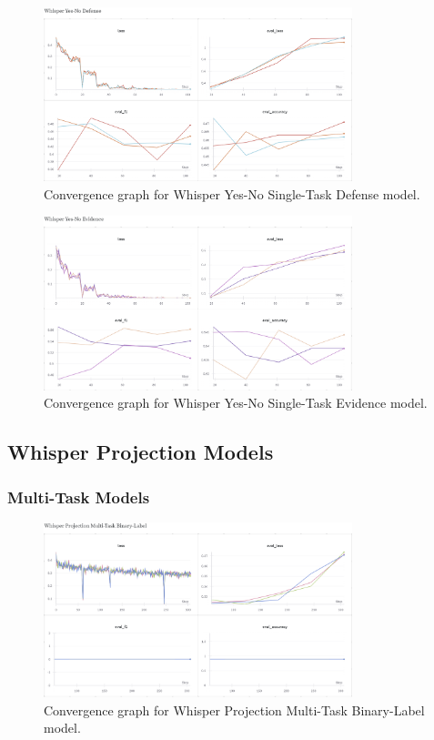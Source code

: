 \documentclass{article}
\begin{document}
\begin{figure}[H]
    \centering
    \includegraphics[width=0.8\textwidth]{convergence_graphs/whisper_yn_defense.png}
    \caption{Convergence graph for Whisper Yes-No Single-Task Defense model.}
    \label{fig:whisper_yn_defense}
\end{figure}

\begin{figure}[H]
    \centering
    \includegraphics[width=0.8\textwidth]{convergence_graphs/whisper_yn_evidence.png}
    \caption{Convergence graph for Whisper Yes-No Single-Task Evidence model.}
    \label{fig:whisper_yn_evidence}
\end{figure}

\subsection{Whisper Projection Models}

\subsubsection{Multi-Task Models}
\begin{figure}[H]
    \centering
    \includegraphics[width=0.8\textwidth]{convergence_graphs/whisper_proj_mtbl.png}
    \caption{Convergence graph for Whisper Projection Multi-Task Binary-Label model.}
    \label{fig:whisper_proj_mtbl}
\end{figure}
\end{document}
